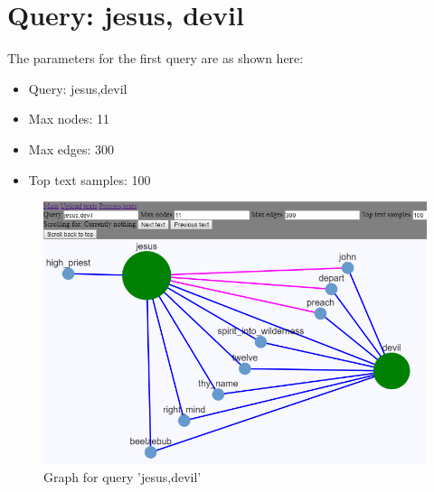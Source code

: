 %
%
%
%
\clearpage
\section{Query: jesus, devil}
\label{sec:query_jesus,devil}
The parameters for the first query are as shown here:
\begin{itemize}
    \item Query: jesus,devil
    \item Max nodes: 11
    \item Max edges: 300
    \item Top text samples: 100
\end{itemize}

\begin{figure}[H]
    \centering
    \includegraphics[scale=0.9]{fig/jesus,devil}
    \caption{Graph for query 'jesus,devil'}
    \label{fig:query_jesus,devil}
\end{figure}

\clearpage

